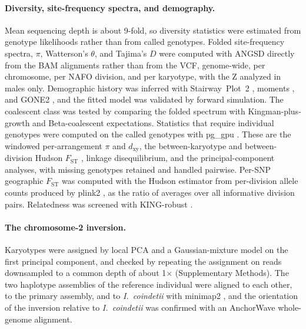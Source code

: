 \documentclass[11pt]{article}
\newcommand{\coin}{\textit{I.\ coindetii}}
\newcommand{\Fst}{F_\mathrm{ST}}
\newcommand{\dxy}{d_\mathrm{xy}}
\begin{document}
\paragraph{Diversity, site-frequency spectra, and demography.}
Mean sequencing depth is about 9-fold, so diversity statistics were estimated from genotype likelihoods rather
than from called genotypes. Folded site-frequency spectra, $\pi$, Watterson's $\theta$, and Tajima's $D$ were
computed with ANGSD \citep{korneliussen2014angsd} directly from the BAM alignments rather than from the VCF, genome-wide, per chromosome, per
NAFO division, and per karyotype, with the Z analyzed in males only. Demographic history was inferred with
Stairway~Plot~2 \citep{liu2020stairway}, moments \citep{jouganous2017moments}, and GONE2 \citep{gone2}, and the
fitted model was validated by forward simulation. The coalescent class was tested by comparing the folded
spectrum with Kingman-plus-growth and Beta-coalescent expectations. Statistics that require individual genotypes
were computed on the called genotypes with pg\_gpu \citep{pggpu}. These are the windowed per-arrangement $\pi$ and $\dxy$, the between-karyotype and between-division Hudson $\Fst$ \citep{bhatia2013}, linkage disequilibrium, and the principal-component analyses, with missing genotypes retained and handled pairwise. Per-SNP geographic $\Fst$ was computed with the Hudson estimator \citep{bhatia2013} from per-division allele counts produced by plink2 \citep{chang2015plink2}, as the ratio of averages over all informative division pairs. Relatedness was screened with KING-robust \citep{manichaikul2010}.

\paragraph{The chromosome-2 inversion.}
Karyotypes were assigned by local PCA \citep{li2019lostruct} and a Gaussian-mixture model on the first principal
component, and checked by repeating the assignment on reads downsampled to a common depth of about 1$\times$ (Supplementary Methods). The two haplotype assemblies of the reference individual were aligned to each other, to the primary
assembly, and to \coin{} with minimap2 \citep{li2018minimap2}, and the orientation of the inversion relative to
\coin{} was confirmed with an AnchorWave \citep{song2022anchorwave} whole-genome alignment.
\end{document}
